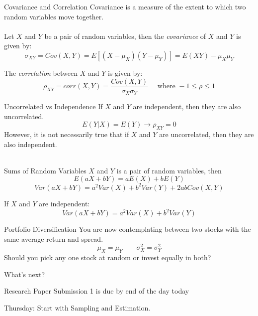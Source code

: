 \documentclass{./../div_teaching_slides}
\begin{document}
\begin{frame}{Covariance and Correlation}
Covariance is a measure of the extent to which two random variables move
together. \\~\\
Let $X$ and $Y$ be a pair of random variables, then the \textit{covariance} of $X$ and $Y$ is given by:
$$ \sigma_{XY} = Cov(X,Y) = E[(X-\mu_X)(Y-\mu_Y)] = E(XY)-\mu_X \mu_Y $$ 
\vspace{0.15em}

The \textit{correlation} between $X$ and $Y$ is given by:
$$ \rho_{XY} = corr(X,Y) = \frac{Cov(X,Y)}{\sigma_X \sigma_Y} \quad \text{ where } -1 \leq \rho \leq 1$$
\end{frame}

\begin{frame}{Uncorrelated vs Independence}
If $X$ and $Y$ are independent, then they are also uncorrelated. 
$$ E(Y|X) = E(Y) \rightarrow \rho_{XY} = 0 $$
However, it is not necessarily true that if $X$ and $Y$ are uncorrelated, then they are also independent. \\~\\
\end{frame}

\begin{frame}{Sums of Random Variables}
$X$ and $Y$ is a pair of random variables, then
$$ E(aX+bY) = aE(X) + bE(Y) $$
$$ Var(aX+bY) = a^2Var(X) + b^2 Var(Y) + 2 ab Cov(X,Y) $$

\vspace{1em}
If $X$ and $Y$ are independent:
$$ Var(aX+bY) = a^2 Var(X) + b^2 Var(Y) $$
\end{frame}

\begin{frame}{Portfolio Diversification}
You are now contemplating between two stocks with the same average return and spread.  
$$ \mu_X = \mu_Y \quad \quad \sigma^2_X = \sigma^2_Y $$
Should you pick any one stock at random or invest equally in both?
\end{frame}

\begin{frame}{What's next?}
\begin{witemize}
  \item Research Paper Submission 1 is due by end of the day today
  \item Thursday: Start with Sampling and Estimation. 
\end{witemize}
\end{frame}
\end{document}
